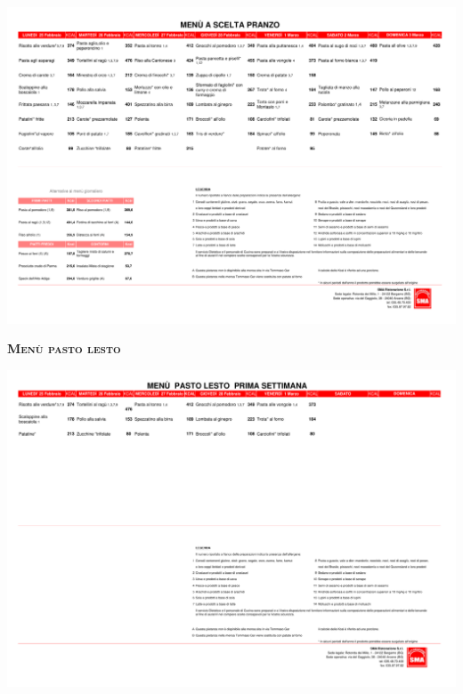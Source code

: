 \documentclass{article}
\begin{document}
\includegraphics[trim=0cm 17.3cm 0cm 2cm,clip,page=10,width=\textwidth,]{scelta.pdf}
\vspace{0.3cm}
\begin{center}
{\Huge \textbf{\textsc{Menù pasto lesto}}}\\
\end{center}
\includegraphics[trim=0cm 23cm 0cm 2cm,clip,page=5,width=\textwidth,]{lesto.pdf}
\end{document}
